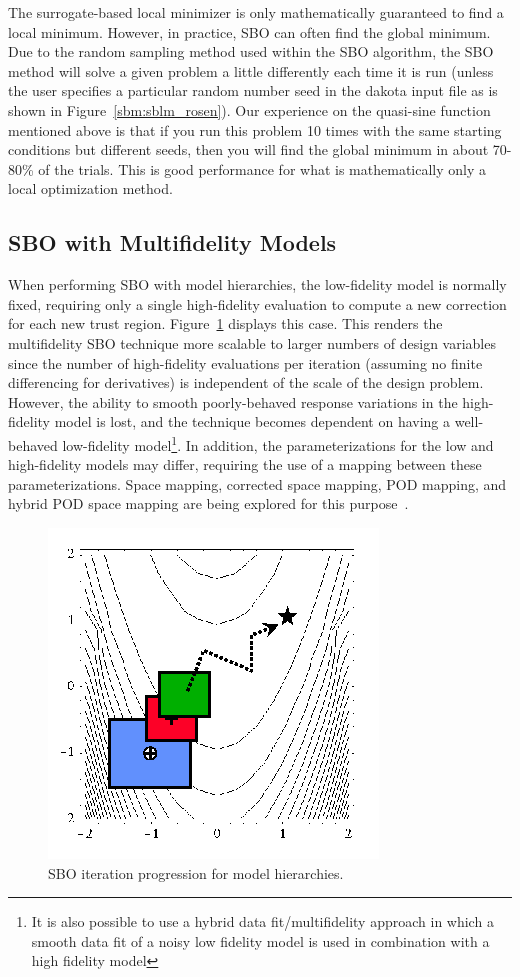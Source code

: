The surrogate-based local minimizer is only mathematically
guaranteed to find a local minimum. However, in practice, SBO can often find 
the global minimum.  Due to the random sampling method used within the
SBO algorithm, the SBO method will solve a given problem a little differently 
each time it is run (unless the user specifies a particular random
number seed in the dakota input file as is shown in Figure~\ref{sbm:sblm_rosen}). 
Our experience on the quasi-sine function mentioned above is that if 
you run this problem 10 times with the same starting conditions but different 
seeds, then you will find the global minimum in about 70-80\% of the trials.
This is good performance for what is mathematically only a local optimization method.

\subsection{SBO with Multifidelity Models}\label{sbm:sblm:multifidelity}

When performing SBO with model hierarchies, the low-fidelity model is
normally fixed, requiring only a single high-fidelity evaluation to
compute a new correction for each new trust region.
Figure~\ref{fig:sbo_mh} displays this case.  This renders the
multifidelity SBO technique more scalable to larger numbers of design
variables since the number of high-fidelity evaluations per iteration
(assuming no finite differencing for derivatives) is independent of
the scale of the design problem.  However, the ability to smooth
poorly-behaved response variations in the high-fidelity model is lost,
and the technique becomes dependent on having a well-behaved
low-fidelity model\footnote{It is also possible to use a hybrid data
fit/multifidelity approach in which a smooth data fit of a noisy low
fidelity model is used in combination with a high fidelity model}.  In
addition, the parameterizations for the low and high-fidelity models
may differ, requiring the use of a mapping between these
parameterizations.  Space mapping, corrected space mapping, POD
mapping, and hybrid POD space mapping are being explored for this
purpose~\cite{Rob06a,Rob06b}.

\begin{figure}
  \centering
  \includegraphics[width=.3\textwidth]{images/sbo_mh}
  \caption{SBO iteration progression for model hierarchies.}
  \label{fig:sbo_mh}
\end{figure}

